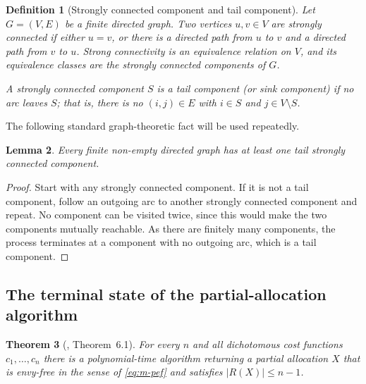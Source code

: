 \documentclass[sigconf,anonymous]{aamas}
\newcommand{\cost}{c}
\newcommand{\abs}[1]{\left\lvert#1\right\rvert}
\theoremstyle{acmplain}
\newtheorem{theorem}{Theorem}[section]
\newtheorem{lemma}[theorem]{Lemma}
\theoremstyle{acmdefinition}
\newtheorem{definition}[theorem]{Definition}
\theoremstyle{acmplain}
\begin{document}
\begin{definition}[Strongly connected component and tail component]
\label{def:scc}
Let $G=(V,E)$ be a finite directed graph. Two vertices \(u,v\in V\) are \emph{strongly connected} if either \(u=v\), or there is a directed path from \(u\) to \(v\) and a directed path from \(v\) to \(u\). Strong connectivity is an equivalence relation on $V$, and its equivalence classes are the \emph{strongly connected components} of $G$.

A strongly connected component $S$ is a \emph{tail component} (or \emph{sink component}) if no arc leaves $S$; that is, there is no $(i,j)\in E$ with $i\in S$ and $j\in V\setminus S$.
\end{definition}

The following standard graph-theoretic fact will be used repeatedly.

\begin{lemma} \label{lem:tail-scc-exists} Every finite non-empty directed graph has at least one tail strongly connected component.
\end{lemma}
\begin{proof}
Start with any strongly connected component. If it is not a tail component, follow an outgoing arc to another strongly connected component and repeat. No component can be visited twice, since this would make the two components mutually reachable. As there are finitely many components, the process terminates at a component with no outgoing arc, which is a tail component.
\end{proof}


\subsection{The terminal state of the partial-allocation algorithm}
\label{sec:m-terminal}

\begin{theorem}[\cite{tao2025existence}, Theorem~6.1] \label{thm:m-twyz} For every $n$ and all dichotomous cost functions $\cost_1,\dots,\cost_n$ there is a polynomial-time algorithm returning a partial allocation $X$ that is envy-free in the sense of \eqref{eq:m-pef} and satisfies $\abs{R(X)} \le n-1$. \end{theorem}
\end{document}
